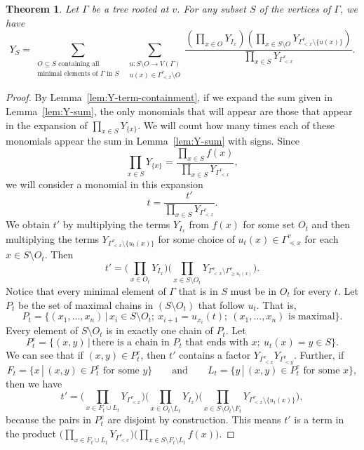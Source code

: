 \documentclass[10pt,a4paper]{amsart}
\numberwithin{equation}{section}
\newtheorem{Theorem}{Theorem}[section]
\begin{document}
\begin{Theorem}\label{thm:Y-formula}
Let $\Gamma$ be a tree rooted at $v$. For any subset $S$ of the vertices of $\Gamma$, we have
\[ Y_S=\sum_{\substack{O\subseteq S\text{ containing all}\\ \text{minimal elements of }\Gamma\text{ in }S}} \, \sum_{\substack{u\colon S\setminus O\to V(\Gamma)\\ u(x)\in\Gamma_{\lessdot x}^v\setminus O}}\frac{\left(\prod_{x\in O}Y_{I_x} \right)\left(\prod_{x\in S\setminus O}Y_{\Gamma_{< x}^v\setminus\{u(x)\}} \right)}{\prod_{x\in S}Y_{\Gamma_{< x}^v}}.\]
\end{Theorem}
\begin{proof}
By Lemma~\ref{lem:Y-term-containment}, if we expand the sum given in Lemma~\ref{lem:Y-sum}, the only monomials that will appear are those that appear in the expansion of $\prod_{x\in S}Y_{\{x\}}$. We will count how many times each of these monomials appear the sum in Lemma~\ref{lem:Y-sum} with signs.
Since
\[ \prod_{x\in S}Y_{\{x\}}=\frac{\prod_{x\in S}f(x)}{\prod_{x\in S}Y_{\Gamma_{< x}^v}},\]
we will consider a monomial in this expansion
\[ t=\frac{t'}{\prod_{x\in S}Y_{\Gamma_{< x}^v}}.\]
We obtain $t'$ by multiplying the terms $Y_{I_x}$ from $f(x)$ for some set $O_t$ and then multiplying the terms $Y_{\Gamma_{< x}^v\setminus\{u_t(x)\}}$ for some choice of $u_t(x)\in\Gamma_{\lessdot x}^v$ for each $x\in S\setminus O_t$. Then \[ t'=\bigg(\prod_{x\in O_t}Y_{I_x} \bigg)\bigg(\prod_{x\in S\setminus O_t}Y_{\Gamma_{< x}^v\setminus\Gamma_{\geq u_t(x)}^v} \bigg).\]
Notice that every minimal element of $\Gamma$ that is in $S$ must be in $O_t$ for every $t$.
Let $P_t$ be the set of maximal chains in $(S\setminus O_t)$ that follow $u_t$. That is,
\[ P_t=\{(x_1,\dots,x_n)\, |\, x_i\in S\setminus O_t;\ x_{i+1}=u_{x_i}(t);\ (x_1,\dots,x_n)\text{ is maximal}\}.\]
Every element of $S\setminus O_t$ is in exactly one chain of $P_t$. Let \[ P_t^e=\{(x,y)\, |\, \text{there is a chain in }P_t\text{ that ends with }x;\ u_t(x)=y\in S\}.\]
We can see that if $(x,y)\in P_t^e$, then $t'$ contains a factor $Y_{\Gamma_{< x}^v}Y_{\Gamma_{< y}^v}$. Further, if
\[
F_t=\{x\, |\, (x,y)\in P_t^e\text{ for some }y\} \qquad \text{and} \qquad L_t=\{y\, |\, (x,y)\in P_t^e\text{ for some }x\},
\] then we have
\[ t'=\bigg(\prod_{x\in F_t\cup L_t}Y_{\Gamma_{< x}^v}\bigg)\bigg(\prod_{x\in O_t\setminus L_t}Y_{I_x} \bigg)\bigg(\prod_{x\in S\setminus O_t\setminus F_t}Y_{\Gamma_{< x}^v\setminus\{u_t(x)\}} \bigg),\]
because the pairs in $P_t^e$ are disjoint by construction. This means $t'$ is a term in the product $\big(\prod_{x\in F_t\cup L_t}Y_{\Gamma_{< x}^v}\big)\big(\prod_{x\in S\setminus F_t\setminus L_t} f(x) \big)$.

\end{proof}
\end{document}
